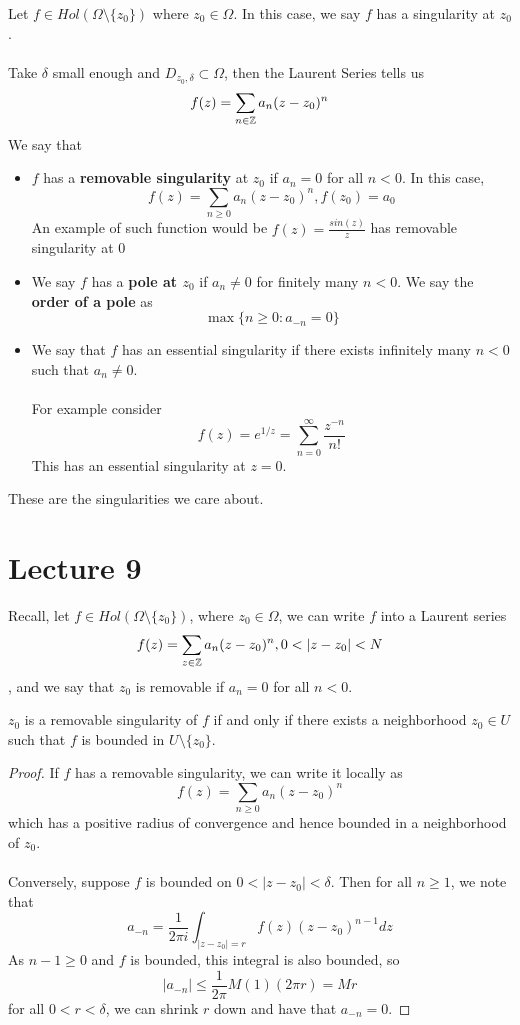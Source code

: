\documentclass{article}
\begin{document}
\begin{definition}
    Let $f \in Hol(\Omega \setminus \{z_0\})$ where $z_0 \in \Omega$. In this case, we say $f$ has a singularity at $z_0$.\\\\
    Take $\delta$ small enough and $D_{z_0, \delta} \subset \Omega$, then the Laurent Series tells us
    \[f(z) = \sum_{n \in \mathbb{Z}} a_n (z - z_0)^n\]
    We say that
    \begin{itemize}
        \item $f$ has a \textbf{removable singularity} at $z_0$ if $a_n = 0$ for all $n < 0$. In this case,
        \[f(z) = \sum_{n \geq 0} a_n (z - z_0)^n, f(z_0) = a_0\]
        An example of such function would be $f(z) = \frac{sin(z)}{z}$ has removable singularity at $0$
        \item We say $f$ has a \textbf{pole at $z_0$} if $a_n \neq 0$ for finitely many $n < 0$. We say the \textbf{order of a pole} as
        \[\max \{n \geq 0: a_{-n} = 0\}\]
        \item We say that $f$ has an essential singularity if there exists infinitely many $n < 0$ such that $a_n \neq 0$.\\\\
        For example consider
        \[f(z) = e^{1/z} = \sum_{n = 0}^\infty \frac{z^{-n}}{n!}\]
        This has an essential singularity at $z = 0$.
    \end{itemize}
    These are the singularities we care about.
\end{definition}

\newpage
\section{Lecture 9}

Recall, let $f \in Hol(\Omega \setminus \{z_0\})$, where $z_0 \in \Omega$, we can write $f$ into a Laurent series
\[f(z) = \sum_{z \in \mathbb{Z}} a_n (z - z_0)^n, 0 < |z - z_0| < N\]
, and we say that $z_0$ is removable if $a_n = 0$ for all $n < 0$.

\begin{theorem}
$z_0$ is a removable singularity of $f$ if and only if there exists a neighborhood $z_0 \in U$ such that $f$ is bounded in $U \setminus \{z_0\}$.
\end{theorem}

\begin{proof}
If $f$ has a removable singularity, we can write it locally as
\[f(z) = \sum_{n \geq 0} a_n (z - z_0)^n\]
which has a positive radius of convergence and hence bounded in a neighborhood of $z_0$.\\\\
Conversely, suppose $f$ is bounded on $0 < |z - z_0| < \delta$. Then for all $n \geq 1$, we note that
\[a_{-n} = \frac{1}{2\pi i} \int_{|z - z_0| = r} f(z) (z - z_0)^{n-1} dz \]
As $n-1 \geq 0$ and $f$ is bounded, this integral is also bounded, so
\[|a_{-n}| \leq \frac{1}{2\pi} M (1) (2\pi r) = Mr\]
for all $0 < r < \delta$, we can shrink $r$ down and have that $a_{-n} = 0$.
\end{proof}
\end{document}
